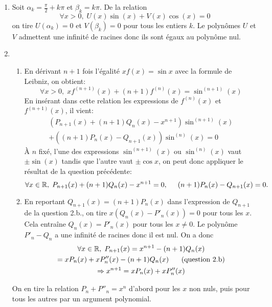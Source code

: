 \begin{enumerate}
\begin{enumerate}
  \item D'après les relations de 2.b.
\begin{displaymath}
\left\lbrace  
\begin{aligned}
P_3 &= XP_2+XQ'_2-3Q_2=X^3-6X \\
Q_3 &= XQ_2-XP'_2+3P_2=3X^2-6
\end{aligned}
\right. 
\end{displaymath}
\end{enumerate}

  \item Soit $\alpha_k=  \frac{\pi}{2}+k\pi$ et $\beta_k= k\pi$. De la relation
\begin{displaymath}
\forall x>0,\; U(x)\sin(x)+V(x)\cos(x)=0   
\end{displaymath}
on tire $U(\alpha_k)=0$ et $V(\beta_k)=0$ pour tous les entiers $k$. Le polynômes $U$ et $V$ admettent une infinit\'e de racines donc ils sont \'egaux au polynôme nul.

  \item
\begin{enumerate}
  \item En d\'erivant $n+1$ fois l'\'egalit\'e $xf(x)=\sin x$ avec la formule de Leibniz, on obtient:
\begin{displaymath}
\forall x >0,\; xf^{(n+1)}(x)+ (n+1)f^{(n)}(x)=\sin^{(n+1)}(x)
\end{displaymath}
En insérant dans cette relation les expressions de $f^{(n)}(x)$ et $f^{(n+1)}(x)$, il vient:
\begin{multline*}
\left( P_{n+1}(x)+(n+1)Q_n(x)-x^{n+1}\right) \sin^{(n+1)}(x) \\+ \left( (n+1)P_n(x)-Q_{n+1}(x)\right) \sin^{(n)}(x)=0  
\end{multline*}
\`A $n$ fix\'e, l'une des expressions $\sin^{(n+1)}(x)$ ou $\sin^{(n)}(x)$ vaut $\pm \sin(x)$ tandis que l'autre vaut $\pm \cos x$, on peut donc appliquer le r\'esultat de la question pr\'ec\'edente:
\begin{displaymath}
\forall x\in \mathbb{R}, \;  P_{n+1}(x)+(n+1)Q_n(x)-x^{n+1} = 0, \hspace{0.5cm} (n+1)P_n(x)-Q_{n+1}(x)=0.
\end{displaymath}

  \item En reportant $Q_{n+1}(x)=(n+1)P_{n}(x)$ dans l'expression de $Q_{n+1}$ de la question 2.b., on tire $x(Q_n(x)-P'_n(x))=0$ pour tous les $x$. Cela entraîne $Q_n(x)=P'_n(x)$ pour tous les $x \neq 0$. Le polynôme $P'_n-Q_n$ a une infinit\'e de racines donc il est nul. \newline
On a donc 
\begin{multline*}
\forall x\in \mathbb{R},\; P_{n+1}(x)= x^{n+1}-(n+1)Q_n(x)\\
= xP_n(x)+xP''_n(x)-(n+1)Q_n(x) \hspace{0.5cm}\text{ (question 2.b)}\\
\Rightarrow
x^{n+1} = xP_n(x)+xP''_n(x)
\end{multline*}
\end{enumerate}
On en tire la relation $P_n + P''_n = x^n$ d'abord pour les $x$ non nuls, puis pour tous les autres par un argument polynomial. 

\end{enumerate}
